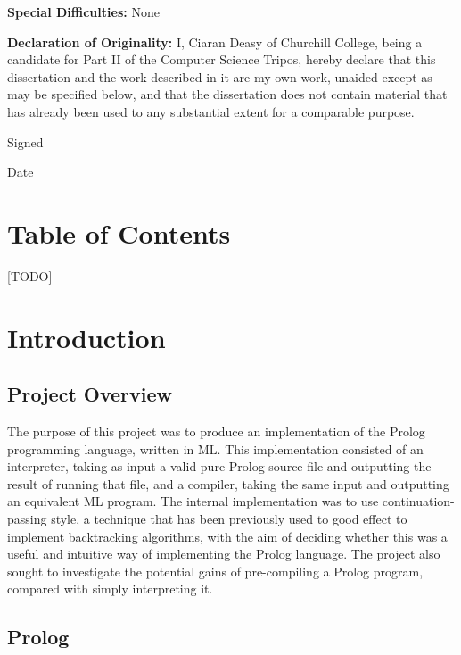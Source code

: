 \documentclass[12pt]{article}
\begin{document}
{\bf Special Difficulties:} None

{\bf Declaration of Originality:}
I, Ciaran Deasy of Churchill College, being a candidate for Part II of the Computer Science Tripos, hereby declare that this dissertation and the work described in it are my own work, unaided except as may be specified below, and that the dissertation does not contain material that has already been used to any substantial extent for a comparable purpose. 

Signed %

Date %

\vfil
\eject

\section*{Table of Contents}

[TODO]

\newpage

\section{Introduction}



\subsection{Project Overview}

The purpose of this project was to produce an implementation of the Prolog programming language, written in ML. 
This implementation consisted of an interpreter, taking as input a valid pure Prolog source file and outputting the result of running that file, and a compiler, taking the same input and outputting an equivalent ML program. 
The internal implementation was to use continuation-passing style, a technique that has been previously used to good effect to implement backtracking algorithms, with the aim of deciding whether this was a useful and intuitive way of implementing the Prolog language. 
The project also sought to investigate the potential gains of pre-compiling a Prolog program, compared with simply interpreting it.

\subsection{Prolog}
\end{document}
